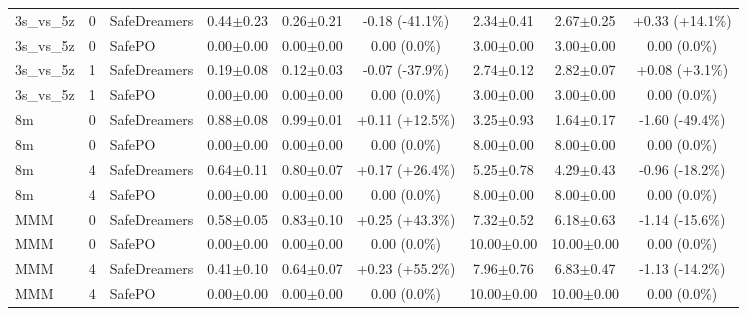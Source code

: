 \documentclass{article}
\begin{document}
\begin{longtable}{lclcccccc}
\midrule
3s\_vs\_5z & 0 & SafeDreamers & 0.44$\pm$0.23 & 0.26$\pm$0.21 & \textcolor{red!85!black}{-0.18 (-41.1\%)} & 2.34$\pm$0.41 & 2.67$\pm$0.25 & \textcolor{red!55!black}{+0.33 (+14.1\%)} \\
3s\_vs\_5z & 0 & SafePO & 0.00$\pm$0.00 & 0.00$\pm$0.00 & \textcolor{red!40!black}{0.00 (0.0\%)} & 3.00$\pm$0.00 & 3.00$\pm$0.00 & \textcolor{green!40!black}{0.00 (0.0\%)} \\
3s\_vs\_5z & 1 & SafeDreamers & 0.19$\pm$0.08 & 0.12$\pm$0.03 & \textcolor{red!85!black}{-0.07 (-37.9\%)} & 2.74$\pm$0.12 & 2.82$\pm$0.07 & \textcolor{red!40!black}{+0.08 (+3.1\%)} \\
3s\_vs\_5z & 1 & SafePO & 0.00$\pm$0.00 & 0.00$\pm$0.00 & \textcolor{red!40!black}{0.00 (0.0\%)} & 3.00$\pm$0.00 & 3.00$\pm$0.00 & \textcolor{green!40!black}{0.00 (0.0\%)} \\
\midrule
8m & 0 & SafeDreamers & 0.88$\pm$0.08 & 0.99$\pm$0.01 & \textcolor{green!55!black}{+0.11 (+12.5\%)} & 3.25$\pm$0.93 & 1.64$\pm$0.17 & \textcolor{green!85!black}{-1.60 (-49.4\%)} \\
8m & 0 & SafePO & 0.00$\pm$0.00 & 0.00$\pm$0.00 & \textcolor{red!40!black}{0.00 (0.0\%)} & 8.00$\pm$0.00 & 8.00$\pm$0.00 & \textcolor{green!40!black}{0.00 (0.0\%)} \\
8m & 4 & SafeDreamers & 0.64$\pm$0.11 & 0.80$\pm$0.07 & \textcolor{green!70!black}{+0.17 (+26.4\%)} & 5.25$\pm$0.78 & 4.29$\pm$0.43 & \textcolor{green!70!black}{-0.96 (-18.2\%)} \\
8m & 4 & SafePO & 0.00$\pm$0.00 & 0.00$\pm$0.00 & \textcolor{red!40!black}{0.00 (0.0\%)} & 8.00$\pm$0.00 & 8.00$\pm$0.00 & \textcolor{green!40!black}{0.00 (0.0\%)} \\
\midrule
MMM & 0 & SafeDreamers & 0.58$\pm$0.05 & 0.83$\pm$0.10 & \textcolor{green!85!black}{+0.25 (+43.3\%)} & 7.32$\pm$0.52 & 6.18$\pm$0.63 & \textcolor{green!70!black}{-1.14 (-15.6\%)} \\
MMM & 0 & SafePO & 0.00$\pm$0.00 & 0.00$\pm$0.00 & \textcolor{red!40!black}{0.00 (0.0\%)} & 10.00$\pm$0.00 & 10.00$\pm$0.00 & \textcolor{green!40!black}{0.00 (0.0\%)} \\
MMM & 4 & SafeDreamers & 0.41$\pm$0.10 & 0.64$\pm$0.07 & \textcolor{green!100!black}{+0.23 (+55.2\%)} & 7.96$\pm$0.76 & 6.83$\pm$0.47 & \textcolor{green!55!black}{-1.13 (-14.2\%)} \\
MMM & 4 & SafePO & 0.00$\pm$0.00 & 0.00$\pm$0.00 & \textcolor{red!40!black}{0.00 (0.0\%)} & 10.00$\pm$0.00 & 10.00$\pm$0.00 & \textcolor{green!40!black}{0.00 (0.0\%)} \\

\end{longtable}
\end{document}

